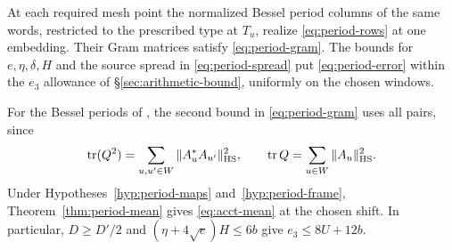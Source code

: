 \begin{hypothesis}[\openinput]\label{hyp:period-frame}
At each required mesh point the normalized Bessel period columns of the
same words, restricted to the prescribed type at $T_u$, realize
\eqref{eq:period-rows} at one embedding. Their Gram matrices satisfy
\eqref{eq:period-gram}. The bounds for $e,\eta,\delta,H$ and the source
spread in \eqref{eq:period-spread} put \eqref{eq:period-error} within
the $e_3$ allowance of \S\ref{sec:arithmetic-bound}, uniformly on the
chosen windows.
\end{hypothesis}

For the Bessel periods of \citep[\S13]{adriazola-grh}, the second
bound in \eqref{eq:period-gram} uses all pairs, since
\[
 \operatorname{tr}(Q^2)=\sum_{u,u'\in W}\|A_u^*A_{u'}\|_{\rm HS}^2,
 \qquad \operatorname{tr}Q=\sum_{u\in W}\|A_u\|_{\rm HS}^2 .
\]
Under Hypotheses~\ref{hyp:period-maps} and~\ref{hyp:period-frame},
Theorem~\ref{thm:period-mean} gives \eqref{eq:acct-mean} at the chosen
shift. In particular, $D\ge D'/2$ and $(\eta+4\sqrt e)H\le6b$ give
$e_3\le8U+12b$.
